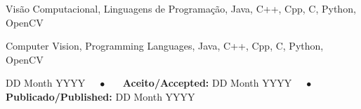 \documentclass[portuguese]{sbc2025}%
\begin{document}
\begin{frontmatter}
\begin{pchaves}
Visão Computacional, Linguagens de Programação, Java, C++, Cpp, C, Python, OpenCV
\end{pchaves}

\begin{keywords}
Computer Vision, Programming Languages, Java, C++, Cpp, C, Python, OpenCV
\end{keywords}

\begin{dates}
 DD Month YYYY~~~$\bullet$~~~
{\sffamily\textbf{Aceito/Accepted:}} DD Month YYYY~~~$\bullet$~~~
{\sffamily\textbf{Publicado/Published:}} DD Month YYYY
\end{dates}



\end{frontmatter}
 











\end{document}
